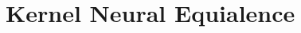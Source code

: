 \chapter{Kernel Neural Equialence} %
\label{Chapter4} %






\newcommand{\theHalgorithm}{\arabic{algorithm}}







